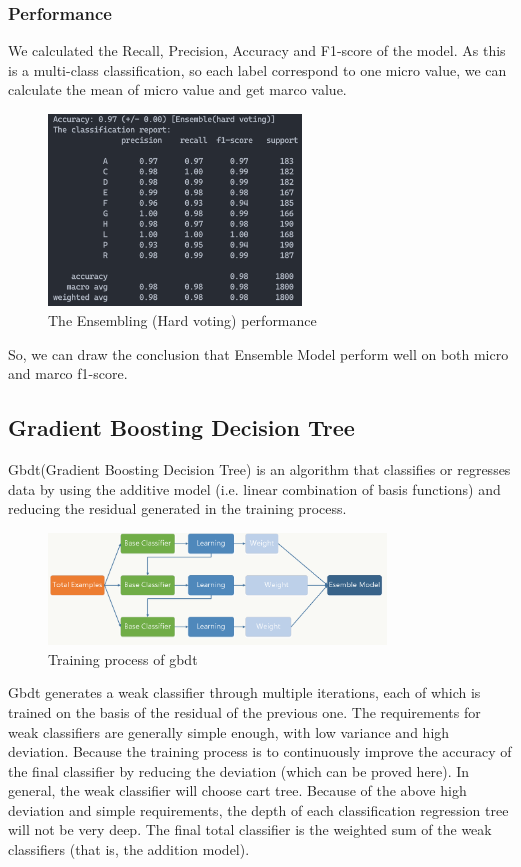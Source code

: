 \documentclass[11pt,en]{elegantpaper}
\begin{document}
\subsubsection*{Performance}
We calculated the Recall, Precision, Accuracy and F1-score of the model. As this is a multi-class classification, so each label correspond to one micro value, we can calculate the mean of micro value and get marco value.
\begin{figure}[H]
	\centering
	\includegraphics[width=0.6\textwidth]{image/hvpf}
	\caption{The Ensembling (Hard voting) performance}
	\label{hvpf}
\end{figure}
So, we can draw the conclusion that Ensemble Model perform well on both micro and marco f1-score.

\subsection{Gradient Boosting Decision Tree}
Gbdt(Gradient Boosting Decision Tree) is an algorithm that classifies or regresses data by using the additive model (i.e. linear combination of basis functions) and reducing the residual generated in the training process.

\begin{figure}[H]
	\centering
	\includegraphics[width=0.8\textwidth]{image/gbdt_1}
	\caption{Training process of gbdt}
	\label{gbdt1}
\end{figure}

Gbdt generates a weak classifier through multiple iterations, each of which is trained on the basis of the residual of the previous one. The requirements for weak classifiers are generally simple enough, with low variance and high deviation. Because the training process is to continuously improve the accuracy of the final classifier by reducing the deviation (which can be proved here).
In general, the weak classifier will choose cart tree. Because of the above high deviation and simple requirements, the depth of each classification regression tree will not be very deep. The final total classifier is the weighted sum of the weak classifiers (that is, the addition model).
\end{document}
